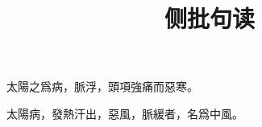 \documentclass{ltc-guji}
\title{侧批句读}
\begin{document}
\begin{正文}
太陽之爲病，脈浮，頭項強痛而惡寒。\par
太陽病，發熱汗出，惡風，脈緩者，名爲中風。\par
\end{正文}
\end{document}
